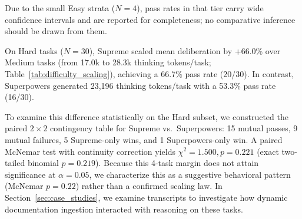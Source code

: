 \begin{table}[h]
\centering
\caption{Deliberation and Win Rates Across Complexity Strata (Wilson 95\% CIs in brackets).}
\label{tab:difficulty_scaling}
\end{table}

Due to the small Easy strata ($N=4$), pass rates in that tier carry wide confidence intervals and are reported for completeness; no comparative inference should be drawn from them.

On Hard tasks ($N=30$), Supreme scaled mean deliberation by +66.0\% over Medium tasks (from 17.0k to 28.3k thinking tokens/task; Table~\ref{tab:difficulty_scaling}), achieving a 66.7\% pass rate (20/30). In contrast, Superpowers generated 23,196 thinking tokens/task with a 53.3\% pass rate (16/30). 

To examine this difference statistically on the Hard subset, we constructed the paired $2 \times 2$ contingency table for Supreme vs.\ Superpowers: 15 mutual passes, 9 mutual failures, 5 Supreme-only wins, and 1 Superpowers-only win. A paired McNemar test with continuity correction yields $\chi^2 = 1.500, p = 0.221$ (exact two-tailed binomial $p = 0.219$). Because this 4-task margin does not attain significance at $\alpha = 0.05$, we characterize this as a suggestive behavioral pattern (McNemar $p = 0.22$) rather than a confirmed scaling law. In Section~\ref{sec:case_studies}, we examine transcripts to investigate how dynamic documentation ingestion interacted with reasoning on these tasks.

